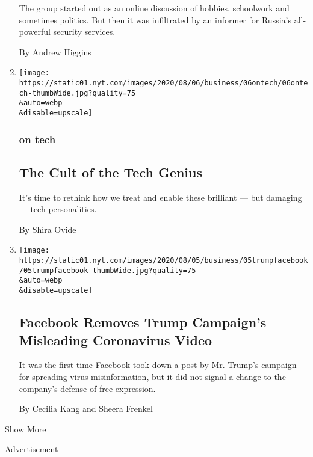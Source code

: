 \begin{enumerate}
  The group started out as an online discussion of hobbies, schoolwork
  and sometimes politics. But then it was infiltrated by an informer for
  Russia's all-powerful security services.

  By Andrew Higgins
\item
  \href{/2020/08/06/technology/the-cult-of-the-tech-genius.html}{}

  \texttt{[image: https://static01.nyt.com/images/2020/08/06/business/06ontech/06ontech-thumbWide.jpg?quality=75\\\&auto=webp\\\&disable=upscale]}

  \hypertarget{on-tech-1}{%
  \subsubsection{on tech}\label{on-tech-1}}

  \hypertarget{the-cult-of-the-tech-genius}{%
  \subsection{The Cult of the Tech
  Genius}\label{the-cult-of-the-tech-genius}}

  It's time to rethink how we treat and enable these brilliant --- but
  damaging --- tech personalities.

  By Shira Ovide
\item
  \href{/2020/08/05/technology/trump-facebook-coronavirus-video.html}{}

  \texttt{[image: https://static01.nyt.com/images/2020/08/05/business/05trumpfacebook/05trumpfacebook-thumbWide.jpg?quality=75\\\&auto=webp\\\&disable=upscale]}

  \hypertarget{facebook-removes-trump-campaigns-misleading-coronavirus-video}{%
  \subsection{Facebook Removes Trump Campaign's Misleading Coronavirus
  Video}\label{facebook-removes-trump-campaigns-misleading-coronavirus-video}}

  It was the first time Facebook took down a post by Mr. Trump's
  campaign for spreading virus misinformation, but it did not signal a
  change to the company's defense of free expression.

  By Cecilia Kang and Sheera Frenkel
\end{enumerate}

Show More

Advertisement

